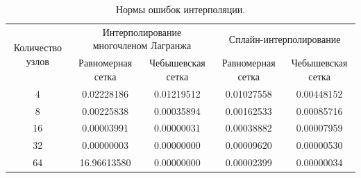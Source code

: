 \documentclass[12pt, a4paper]{article}
\begin{document}
	\begin{table}[H]
		\caption{Нормы ошибок интерполяции.}
		\centering
		\footnotesize
		\begin{tabular}{|c|c|c|c|c|}
			\hline
			\multirow{2}{5em}{Количество узлов} & \multicolumn{2}{|c|}{Интерполирование многочленом Лагранжа}&\multicolumn{2}{|c|}{Сплайн-интерполирование}\\
			\cline{2-5}
			&Равномерная сетка &Чебышевская сетка &Равномерная сетка&Чебышевская сетка\\
			\hline
			4& 0.02228186&0.01219512&0.01027558&0.00448152\\
			\hline
			8&0.00225838&0.00035894&0.00162533&0.00085716\\
			\hline
			16&0.00003991&0.00000031&0.00038882& 0.00007959\\
			\hline
			32&0.00000003&0.00000000&0.00009620&0.00000530\\
			\hline
			64&16.96613580&0.00000000&0.00002399&0.00000034\\
			\hline
		\end{tabular}
	\end{table}
	
\end{document}
